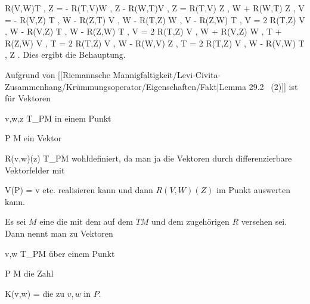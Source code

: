{{\mavergleichskettealigndrucklinks
{\vergleichskettealigndrucklinks
{ \left\langle R(V,W)T , Z  \right\rangle
}
{ =} { - \left\langle R(T,V)W , Z  \right\rangle - \left\langle R(W,T)V , Z  \right\rangle
}
{ =} { \left\langle R(T,V) Z , W  \right\rangle + \left\langle R(W,T) Z ,  V  \right\rangle
}
{ =} { - \left\langle R(V,Z) T , W  \right\rangle - \left\langle R(Z,T) V  ,  W  \right\rangle - \left\langle R(T,Z) W ,  V  \right\rangle - \left\langle R(Z,W) T ,  V  \right\rangle
}
{ =} { 2 \left\langle R(T,Z) V  ,  W  \right\rangle - \left\langle R(V,Z) T , W  \right\rangle - \left\langle R(Z,W) T ,  V  \right\rangle
}
}
{
\vergleichskettefortsetzungalign
{ =} { 2 \left\langle R(T,Z) V  ,  W  \right\rangle + \left\langle R(V,Z) W , T  \right\rangle + \left\langle R(Z,W) V  ,  T  \right\rangle
}
{ =} { 2 \left\langle R(T,Z) V  ,  W  \right\rangle - \left\langle R(W,V) Z , T  \right\rangle
}
{ =} { 2 \left\langle R(T,Z) V  ,  W  \right\rangle - \left\langle R(V,W) T , Z  \right\rangle
}
{ } {}
}{}{.}
Dies ergibt die Behauptung.
}

}

Aufgrund von
[[Riemannsche Mannigfaltigkeit/Levi-Civita-Zusammenhang/Krümmungsoperator/Eigenschaften/Fakt|Lemma 29.2  (2)]]
ist für Vektoren

\mavergleichskette
{\vergleichskette
{ v,w,z
}
{ \in }{ T_PM
}
{  }{
}
{    }{
}
{   }{
}
}
{}{}{}
in einem Punkt

\mavergleichskette
{\vergleichskette
{ P
}
{ \in }{ M
}
{  }{
}
{    }{
}
{   }{
}
}
{}{}{}
ein Vektor

\mavergleichskette
{\vergleichskette
{ R(v,w)(z)
}
{ \in }{ T_PM
}
{  }{
}
{    }{
}
{   }{
}
}
{}{}{}
wohldefiniert, da man ja die Vektoren durch differenzierbare Vektorfelder
 mit

\mavergleichskette
{\vergleichskette
{ V(P)
}
{ = }{ v
}
{  }{
}
{    }{
}
{   }{
}
}
{}{}{}
etc.
 {} {}
realisieren kann und dann $R(V,W)(Z)$ im Punkt auswerten kann.


{}
{

Es sei $M$ eine
die mit dem
auf dem
$TM$ und dem zugehörigen
$R$ versehen sei. Dann nennt man zu
Vektoren

\mavergleichskette
{\vergleichskette
{ v,w
}
{ \in }{ T_PM
}
{  }{
}
{    }{
}
{   }{
}
}
{}{}{}
über einem Punkt

\mavergleichskette
{\vergleichskette
{ P
}
{ \in }{ M
}
{  }{
}
{    }{
}
{   }{
}
}
{}{}{}
die Zahl

\mavergleichskettedisp
{\vergleichskette
{ K(v,w)
}
{ =} { {  }
}
{ } {
}
{ } {
}
{ } {
}
}
{}{}{}
die
zu $v,w$ in $P$.

}

